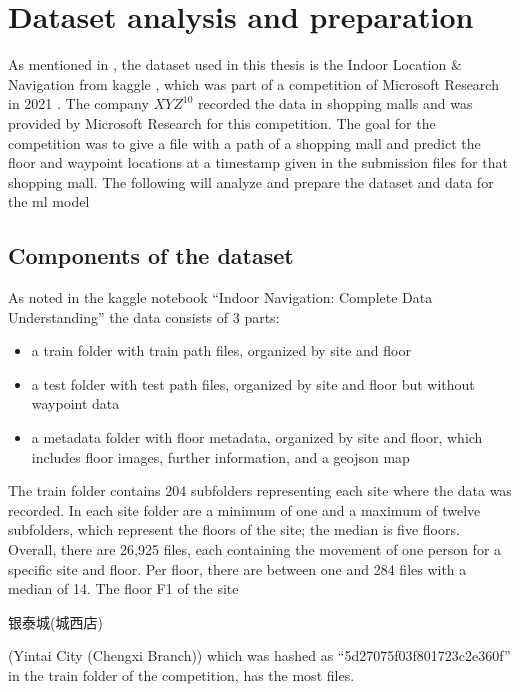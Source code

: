 \chapter{Dataset analysis and preparation}\label{ch:data-ana}

As mentioned in , the dataset used in this thesis is the Indoor Location \& Navigation from kaggle \cite{kaggle}, which was part of a competition of Microsoft Research in 2021 \cite{IndoorLocationNavigation}.
The company \(XYZ^{10}\) recorded the data in shopping malls and was provided by Microsoft Research for this competition.
The goal for the competition was to give a file with a path of a shopping mall and predict the floor and waypoint locations at a timestamp given in the submission files for that shopping mall.
The following will analyze and prepare the dataset and data for the \ac{ml} model

\section{Components of the dataset}\label{sec:data}
As noted in the kaggle notebook ``Indoor Navigation: Complete Data Understanding'' \cite{IndoorNavigationUnderstanding} the data consists of 3 parts:

\begin{itemize}
    \item a train folder with train path files, organized by site and floor
    \item a test folder with test path files, organized by site and floor but without waypoint data
    \item a metadata folder with floor metadata, organized by site and floor, which includes floor images, further information, and a geojson map
\end{itemize}

The train folder contains 204 subfolders representing each site where the data was recorded.
In each site folder are a minimum of one and a maximum of twelve subfolders, which represent the floors of the site; the median is five floors.
Overall, there are 26,925 files, each containing the movement of one person for a specific site and floor.
Per floor, there are between one and 284 files with a median of 14.
The floor F1 of the site \begin{CJK*}{UTF8}{gbsn}银泰城(城西店)\end{CJK*} (Yintai City (Chengxi Branch)) which was hashed as ``5d27075f03f801723c2e360f'' in the train folder of the competition, has the most files.

